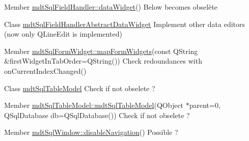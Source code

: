 \begin{DoxyDescription}
\item[Member \hyperlink{classmdt_sql_field_handler_a91ab8160d5015b6030e7169ab7108d33}{mdtSqlFieldHandler::dataWidget}() ]Below becomes obselète 
\end{DoxyDescription}

\label{todo__todo000059}
\hypertarget{todo__todo000059}{}
 
\begin{DoxyDescription}
\item[Class \hyperlink{classmdt_sql_field_handler_abstract_data_widget}{mdtSqlFieldHandlerAbstractDataWidget} ]Implement other data editors (now only QLineEdit is implemented) 
\end{DoxyDescription}

\label{todo__todo000062}
\hypertarget{todo__todo000062}{}
 
\begin{DoxyDescription}
\item[Member \hyperlink{classmdt_sql_form_widget_ace4f7fad749a4efe1233b61d071b3926}{mdtSqlFormWidget::mapFormWidgets}(const QString \&firstWidgetInTabOrder=QString()) ]Check redoundances with onCurrentIndexChanged() 
\end{DoxyDescription}

\label{todo__todo000065}
\hypertarget{todo__todo000065}{}
 
\begin{DoxyDescription}
\item[Class \hyperlink{classmdt_sql_table_model}{mdtSqlTableModel} ]Check if not obselete ? 
\end{DoxyDescription}

\label{todo__todo000064}
\hypertarget{todo__todo000064}{}
 
\begin{DoxyDescription}
\item[Member \hyperlink{classmdt_sql_table_model_ad423c1b0c74ecbbb575637b028c2574b}{mdtSqlTableModel::mdtSqlTableModel}(QObject $\ast$parent=0, QSqlDatabase db=QSqlDatabase()) ]Check if not obselete ? 
\end{DoxyDescription}

\label{todo__todo000066}
\hypertarget{todo__todo000066}{}
 
\begin{DoxyDescription}
\item[Member \hyperlink{classmdt_sql_window_a961d587d63b0997a10db6728773a108f}{mdtSqlWindow::disableNavigation}() ]Possible ? 
\end{DoxyDescription}

